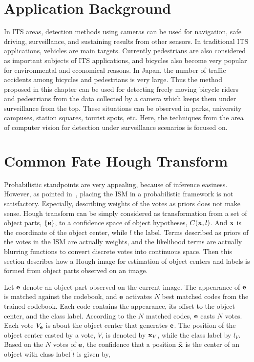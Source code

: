 \section{Application Background}
\label{ab4}
In ITS areas, detection methods using cameras can be used for navigation, safe driving, surveillance, and sustaining results from other sensors. In traditional ITS applications, vehicles are main targets. Currently pedestrians are also considered as important subjects of ITS applications, and bicycles also become very popular for environmental and economical reasons. In Japan, the number of traffic accidents among bicycles and pedestrians is very large. Thus the method proposed in this chapter can be used for detecting freely moving bicycle riders and pedestrians from the data collected by a camera which keeps them under surveillance from the top. These situations can be observed in parks, university campuses, station squares, tourist spots, etc.  Here, the techniques from the area of computer vision for detection under surveillance scenarios is focused on.

\section{Common Fate Hough Transform}
\label{pip4}
Probabilistic standpoints are very appealing, because of inference easiness. However, as pointed in~\cite{ac27}, placing the ISM in a probabilistic framework is not satisfactory. Especially, describing weights of the votes as priors does not make sense.
Hough transform can be simply considered as transformation from a set of  object parts, $\{\bf{e}\}$,  to a confidence space of object hypotheses, $C({\bf{x}},l)$. And $\bf{x}$ is the coordinate of the object center, while $l$ the label. Terms described as priors of the votes in the ISM are actually weights, and the likelihood terms are actually blurring functions to convert discrete votes into continuous space. Then this section describes how a Hough image for estimation of object centers and labels is formed from object parts observed on an image.


Let $\bf{e}$ denote an object part observed on the current image. The appearance of $\bf{e}$ is matched against the codebook, and $\bf{e}$ activates $N$ best matched codes from the trained codebook. Each code contains the appearance, its offset to the object center, and the class label. According to the $N$ matched codes, $\bf{e}$ casts $N$ votes. Each vote $V_{\bf{e}}$ is about the object center that generates $\bf{e}$. The position of the object center casted by  a vote, $V$, is denoted by ${\bf{x}}_V$, while the class label by $l_V$. Based on the $N$ votes of $\bf{e}$, the confidence that a position $\tilde{\bf{x}}$ is the center of an object with class label $\tilde{l}$ is given by,

